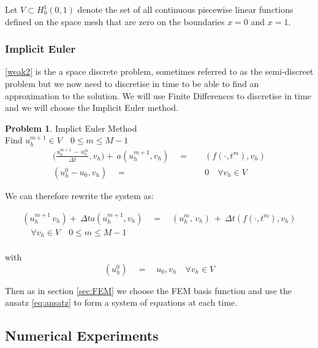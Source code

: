 \documentclass{uonmathreport}
\theoremstyle{definition}
\theoremstyle{problem}
\newtheorem{problem}{Problem}[section]
\theoremstyle{theorem}
\begin{document}
Let $V\subset H^1_0(0, 1)$ denote the set of all continuous piecewise linear functions defined on the space mesh that are zero on the boundaries $x=0$ and $x=1$. 

\subsubsection{Implicit Euler} \label{subsubsec:Implicit Euler}

\ref{weak2} is the a space discrete problem, sometimes referred to as the semi-discreet problem but we now need to discretise in time to be able to find an approximation to the solution. We will use Finite Differences to discretise in time and we will choose the Implicit Euler method. 


\begin{problem}{Implict Euler Method} \label{eq:Implicit Euler}
\\Find $u_h^{m+1} \in V \quad 0 \leq m \leq M-1$
\begin{align*}
\Big(\frac{u_h^{m+1} \, - \, u_h^{m}}{\Delta t}, v_h \Big) +\: a(u_h^{m+1}, v_h) \quad=&\quad (f(\cdot, t^m), v_h) \\
(u^{0}_h - u_0, v_h)\quad  =& \quad0 \quad \forall v_h \in V
\end{align*}
\end{problem}

We can therefore rewrite the system as:

\begin{align*}
( u_h^{m+1} \, v_h)  + \: \Delta t a(u_h^{m+1}, v_h) \quad=\quad (u_h^{m}, \, v_h ) \:+\: \Delta t(f(\cdot, t^m), v_h) \\
\quad \forall v_h \in V \quad 0 \leq m \leq M-1 \\
\end{align*}

	with
\begin{equation*}
(u^{0}_h) \quad  = \quad u_0, v_h \quad \forall v_h \in V
\end{equation*}

Then as in section \ref{sec:FEM} we choose the FEM basis function and use the ansatz \ref{eq:ansatz} to form a system of equations at each time.

\subsection{Numerical Experiments} \label{subsec:results2}
\end{document}
